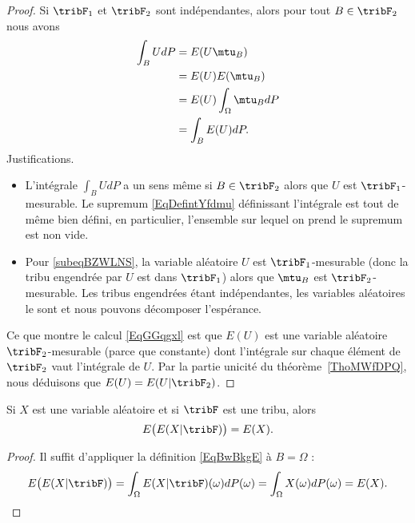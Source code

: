\begin{proof}
    Si \( \tribF_1\) et \( \tribF_2\) sont indépendantes, alors pour tout \( B\in\tribF_2\) nous avons
    \begin{subequations}    \label{EqGGqgxl}
            \begin{align}
                \int_B UdP&=E(U\mtu_B)\\
                &=E(U)E(\mtu_B)         \label{subeqBZWLNS}\\
                &=E(U)\int_{\Omega}\mtu_BdP\\
                &=\int_B E(U)dP.
            \end{align}
        \end{subequations}
    Justifications.
    \begin{itemize}
        \item L'intégrale \( \int_BUdP\) a un sens même si \( B\in\tribF_2\) alors que \( U\) est \( \tribF_1\)-mesurable. Le supremum \eqref{EqDefintYfdmu} définissant l'intégrale est tout de même bien défini, en particulier, l'ensemble sur lequel on prend le supremum est non vide.
        \item
            Pour \eqref{subeqBZWLNS}, la variable aléatoire \( U\) est \( \tribF_1\)-mesurable (donc la tribu engendrée par \( U\) est dans \( \tribF_1\)) alors que \( \mtu_B\) est \( \tribF_2\)-mesurable. Les tribus engendrées étant indépendantes, les variables aléatoires le sont et nous pouvons décomposer l'espérance.
    \end{itemize}
    Ce que montre le calcul \eqref{EqGGqgxl} est que \( E(U)\) est une variable aléatoire \( \tribF_2\)-mesurable (parce que constante) dont l'intégrale sur chaque élément de \( \tribF_2\) vaut l'intégrale de \( U\). Par la partie unicité du théorème~\ref{ThoMWfDPQ}, nous déduisons que \( E(U)=E(U|\tribF_2)\).
\end{proof}

\begin{corollary}   \label{CorakyvMp}
    Si \( X\) est une variable aléatoire et si \( \tribF\) est une tribu, alors
    \begin{equation}
        E\big( E(X|\tribF) \big)=E(X).
    \end{equation}
\end{corollary}

\begin{proof}
    Il suffit d'appliquer la définition \eqref{EqBwBkgE} à \( B=\Omega\) :
    \begin{equation}
            E\big( E(X|\tribF) \big)=\int_{\Omega}E(X|\tribF)(\omega)dP(\omega)=\int_{\Omega}X(\omega)dP(\omega)=E(X).
    \end{equation}
\end{proof}

